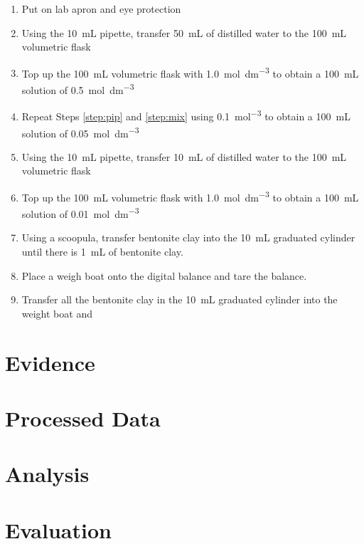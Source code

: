 \documentclass[11pt, letterpaper]{article}
\begin{document}
\begin{enumerate}
    \item Put on lab apron and eye protection
    \item Using the \SI{10}{mL} pipette, transfer \SI{50}{mL} of distilled water to the \SI{100}{mL} volumetric flask \label{step:pip}
    \item Top up the \SI{100}{mL} volumetric flask with \SI{1.0}{mol.dm^{-3}}  to obtain a \SI{100}{mL} solution of \SI{0.5}{mol.dm^{-3}}  \label{step:mix}
    \item Repeat Steps \ref*{step:pip} and \ref*{step:mix} using \SI{0.1}{mol^{-3}}  to obtain a \SI{100}{mL} solution of \SI{0.05}{mol.dm^{-3}} 
    \item Using the \SI{10}{mL} pipette, transfer \SI{10}{mL} of distilled water to the \SI{100}{mL} volumetric flask
    \item Top up the \SI{100}{mL} volumetric flask with \SI{1.0}{mol.dm^{-3}}  to obtain a \SI{100}{mL} solution of \SI{0.01}{mol.dm^{-3}} 
    \item Using a scoopula, transfer bentonite clay into the \SI{10}{mL} graduated cylinder until there is \SI{1}{mL} of bentonite clay.
    \item Place a weigh boat onto the digital balance and tare the balance.
    \item Transfer all the bentonite clay in the \SI{10}{mL} graduated cylinder into the weight boat and
\end{enumerate}

\section{Evidence}

\section{Processed Data}

\section{Analysis}

\section{Evaluation}




\end{document}
